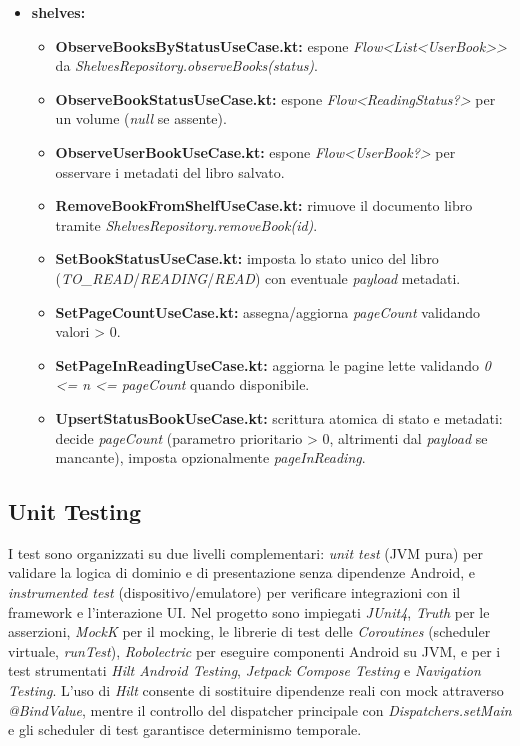\documentclass{article}
\begin{document}
\begin{itemize}
  \item \textbf{shelves:}
  \begin{itemize}
    \item \textbf{ObserveBooksByStatusUseCase.kt:} espone \textit{Flow\textless{}List\textless{}UserBook\textgreater{}\textgreater{}} da \textit{ShelvesRepository.observeBooks(status)}.
    \item \textbf{ObserveBookStatusUseCase.kt:} espone \textit{Flow\textless{}ReadingStatus?\textgreater{}} per un volume (\textit{null} se assente).
    \item \textbf{ObserveUserBookUseCase.kt:} espone \textit{Flow\textless{}UserBook?\textgreater{}} per osservare i metadati del libro salvato.
    \item \textbf{RemoveBookFromShelfUseCase.kt:} rimuove il documento libro tramite \textit{ShelvesRepository.removeBook(id)}.
    \item \textbf{SetBookStatusUseCase.kt:} imposta lo stato unico del libro (\textit{TO\_READ}/\textit{READING}/\textit{READ}) con eventuale \textit{payload} metadati.
    \item \textbf{SetPageCountUseCase.kt:} assegna/aggiorna \textit{pageCount} validando valori \textgreater{} 0.
    \item \textbf{SetPageInReadingUseCase.kt:} aggiorna le pagine lette validando \textit{0 \textless{}= n \textless{}= pageCount} quando disponibile.
    \item \textbf{UpsertStatusBookUseCase.kt:} scrittura atomica di stato e metadati: decide \textit{pageCount} (parametro prioritario \textgreater{} 0, altrimenti dal \textit{payload} se mancante), imposta opzionalmente \textit{pageInReading}.
  \end{itemize}
\end{itemize}


\subsection{Unit Testing}
I test sono organizzati su due livelli complementari: \textit{unit test} (JVM pura) per validare la logica di dominio e di presentazione senza dipendenze Android, e \textit{instrumented test} (dispositivo/emulatore) per verificare integrazioni con il framework e l’interazione UI. Nel progetto sono impiegati \textit{JUnit4}, \textit{Truth} per le asserzioni, \textit{MockK} per il mocking, le librerie di test delle \textit{Coroutines} (scheduler virtuale, \textit{runTest}), \textit{Robolectric} per eseguire componenti Android su JVM, e per i test strumentati \textit{Hilt Android Testing}, \textit{Jetpack Compose Testing} e \textit{Navigation Testing}. L’uso di \textit{Hilt} consente di sostituire dipendenze reali con mock attraverso \textit{@BindValue}, mentre il controllo del dispatcher principale con \textit{Dispatchers.setMain} e gli scheduler di test garantisce determinismo temporale.
\end{document}
